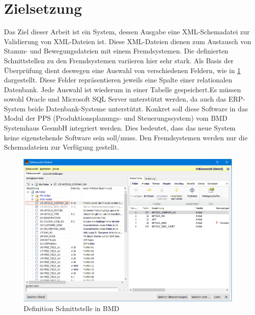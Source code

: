 \section{Zielsetzung}
Das Ziel dieser Arbeit ist ein System, dessen Ausgabe eine XML-Schemadatei zur Validierung von XML-Dateien ist. Diese XML-Dateien dienen zum Austausch von Stamm- und Bewegungsdateien mit einem Fremdsystemen. Die definierten Schnittstellen zu den Fremdsystemen variieren hier sehr stark.
Als Basis der Überprüfung dient deswegen eine Auswahl von 
verschiedenen Feldern, wie in \ref{fig:Feldauswahl} dargestellt. Diese Felder repräsentieren jeweils 
eine Spalte einer relationalen Datenbank. Jede Auswahl ist 
wiederum in einer Tabelle gespeichert.Es müssen sowohl Oracle 
und Microsoft SQL Server unterstützt werden, da auch das ERP-System beide Datenbank-Systeme unterstützt. 
Konkret soll diese Software in das Modul der PPS (Produktionsplanungs- und Steuerungssystem) vom BMD Systemhaus GesmbH integriert werden. 
Dies bedeutet, dass das neue System keine eigenstehende Software sein soll/muss. 
Den Fremdsystemen werden nur die Schemadateien zur Verfügung gestellt.

\begin{figure}
    \centering
    \includegraphics[width=.95\textwidth]{images/Feldauswahl.png}
    \caption{Definition Schnittstelle in BMD}
    \label{fig:Feldauswahl}
\end{figure}



